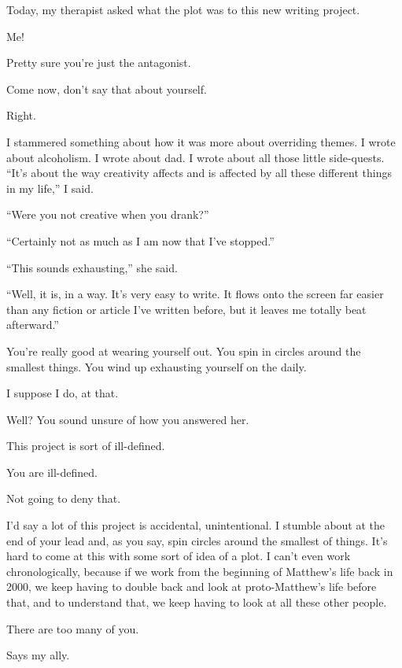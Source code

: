 \noindent Today, my therapist asked what the plot was to this new writing project.

\begin{ally}
Me!
\end{ally}
Pretty sure you're just the antagonist.

\begin{ally}
Come now, don't say that about yourself.
\end{ally}
Right.

I stammered something about how it was more about overriding themes. I wrote about alcoholism. I wrote about dad. I wrote about all those little side-quests. ``It's about the way creativity affects and is affected by all these different things in my life,'' I said.

``Were you not creative when you drank?''

``Certainly not as much as I am now that I've stopped.''

``This sounds exhausting,'' she said.

``Well, it is, in a way. It's very easy to write. It flows onto the screen far easier than any fiction or article I've written before, but it leaves me totally beat afterward.''

\begin{ally}
You're really good at wearing yourself out. You spin in circles around the smallest things. You wind up exhausting yourself on the daily.
\end{ally}
I suppose I do, at that.

\begin{ally}
Well? You sound unsure of how you answered her.
\end{ally}
This project is sort of ill-defined.

\begin{ally}
You are ill-defined.
\end{ally}
Not going to deny that.

I'd say a lot of this project is accidental, unintentional. I stumble about at the end of your lead and, as you say, spin circles around the smallest of things. It's hard to come at this with some sort of idea of a plot. I can't even work chronologically, because if we work from the beginning of Matthew's life back in 2000, we keep having to double back and look at proto-Matthew's life before that, and to understand that, we keep having to look at all these other people.

\begin{ally}
There are too many of you.
\end{ally}
Says my ally.

